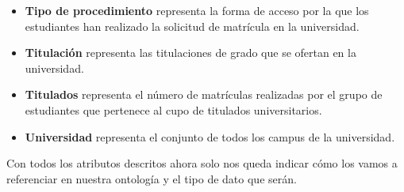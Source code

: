 \begin{itemize}
	\item \textbf{Tipo de procedimiento} representa la forma de acceso por la que los estudiantes han realizado la solicitud de matrícula en la universidad.
	\item \textbf{Titulación} representa las titulaciones de grado que se ofertan en la universidad.
	\item \textbf{Titulados} representa el número de matrículas realizadas por el grupo de estudiantes que pertenece al cupo de titulados universitarios.
	\item \textbf{Universidad} representa el conjunto de todos los campus de la universidad.
\end{itemize}

Con todos los atributos descritos ahora solo nos queda indicar cómo los vamos a referenciar en nuestra ontología y el tipo de dato que serán.

